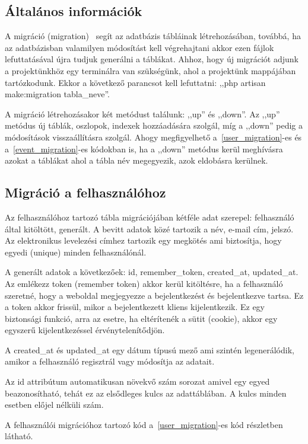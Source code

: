 \documentclass[
]{thesis-ekf}
\theoremstyle{definition}
\theoremstyle{remark}
\begin{document}
	\subsection{Általános információk}
	A migráció (migration)~\cite{laravel_migartion} segít az adatbázis tábláinak létrehozásában, továbbá, ha az adatbázisban valamilyen módosítást kell végrehajtani akkor ezen fájlok lefuttatásával újra tudjuk generálni a táblákat. Ahhoz, hogy új migrációt adjunk a projektünkhöz egy terminálra van szükségünk, ahol a projektünk mappájában tartózkodunk. Ekkor a következő parancsot kell lefuttatni: ,,php artisan make:migration tabla\_neve''.
	
	A migráció létrehozásakor két metódust találunk: ,,up'' és ,,down''. Az ,,up'' metódus új táblák, oszlopok, indexek hozzáadására szolgál, míg a ,,down'' pedig a módosítások visszaállításra szolgál. Ahogy megfigyelhető a~\ref{user_migration}-es és a~\ref{event_migration}-es kódokban is, ha a ,,down'' metódus kerül meghívásra azokat a táblákat ahol a tábla név megegyezik, azok eldobásra kerülnek.
	
	\subsection{Migráció a felhasználóhoz}
	Az felhasználóhoz tartozó tábla migrációjában kétféle adat szerepel: felhasználó által kitöltött, generált. A bevitt adatok közé tartozik a név, e-mail cím, jelszó. Az elektronikus levelezési címhez tartozik egy megkötés ami biztosítja, hogy egyedi (unique) minden felhasználónál. 
	
	A generált adatok a következőek: id, remember\_token, created\_at, updated\_at. Az emlékezz token (remember token) akkor kerül kitöltésre, ha a felhasználó szeretné, hogy a weboldal megjegyezze a bejelentkezést és bejelentkezve tartsa. Ez a token akkor frissül, mikor a bejelentkezett kliens kijelentkezik. Ez egy biztonsági funkció, arra az esetre, ha eltérítenék a sütit (cookie), akkor egy egyszerű kijelentkezéssel érvénytelenítődjön. 
	
	A created\_at és updated\_at egy dátum típusú mező ami szintén legenerálódik, amikor a felhasználó regisztrál vagy módosítja az adatait. 
	
	Az id attribútum automatikusan növekvő szám sorozat amivel egy egyed beazonosítható, tehát ez az elsődleges kulcs az adattáblában.  A kulcs minden esetben előjel nélküli szám.
	
	A felhasználói migrációhoz tartozó kód a~\ref{user_migration}-es kód részletben látható.
	
\end{document}
